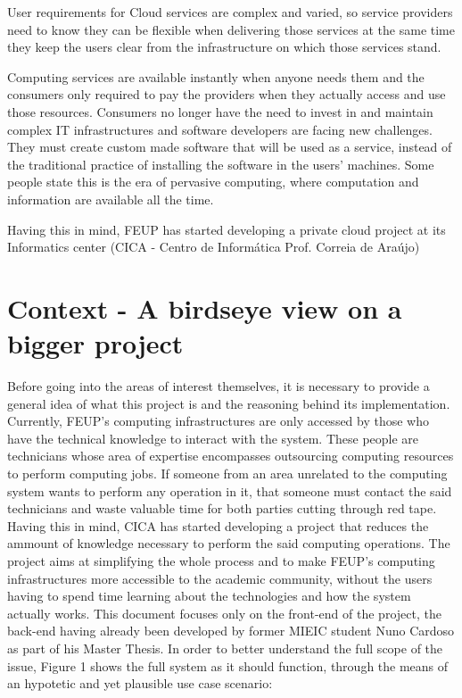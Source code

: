 User requirements for Cloud services are complex and varied, so service providers need to know they can be flexible when delivering those services at the same time they keep the users clear from the infrastructure on which those services stand.

Computing services are available instantly when anyone needs them and the consumers only required to pay the providers when they actually access and use those resources. Consumers no longer have the need to invest in and maintain complex IT infrastructures and software developers are facing new challenges. They must create custom made software that will be used as a service, instead of the traditional practice of installing the software in the users' machines. Some people state this is the era of pervasive computing, where computation and information are available all the time.~\citet{ieees}

Having this in mind, FEUP has started developing a private cloud project at its Informatics center (CICA - Centro de Informática Prof. Correia de Araújo)

\section{Context - A birdseye view on a bigger project} \label{sec:project}

Before going into the areas of interest themselves, it is necessary to provide a general idea of what this project is and the reasoning behind its implementation.
Currently, FEUP's computing infrastructures are only accessed by those who have the technical knowledge to interact with the system. These people are technicians whose area of expertise encompasses outsourcing computing resources to perform computing jobs. If someone from an area unrelated to the computing system wants to perform any operation in it, that someone must contact the said technicians and waste valuable time for both parties cutting through red tape.
Having this in mind, CICA has started developing a project that reduces the ammount of knowledge necessary to perform the said computing operations.
The project aims at simplifying the whole process and to make FEUP's computing infrastructures more accessible to the academic community, without the users having to spend time learning about the technologies and how the system actually works.
This document focuses only on the front-end of the project, the back-end having already been developed by former MIEIC student Nuno Cardoso as part of his Master Thesis.
In order to better understand the full scope of the issue, Figure 1 shows the full system as it should function, through the means of an hypotetic and yet plausible use case scenario:

